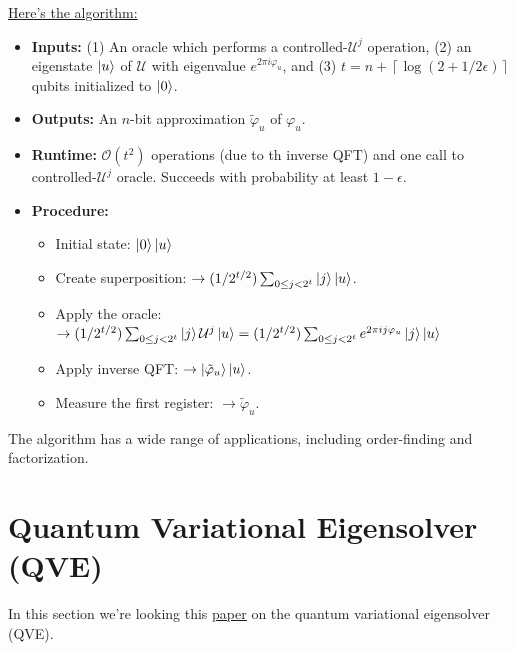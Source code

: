 \documentclass{book}
\theoremstyle{definition}
\newcommand{\lp}{\left(}
\newcommand{\rp}{\right)}
\newcommand{\U}{\mathcal{U}}
\begin{document}
\underline{Here's the algorithm:}
\begin{itemize}
	\item \textbf{Inputs:} (1) An oracle which performs a controlled-$\U^j$ operation, (2) an eigenstate $\ket{u}$ of $\U$ with eigenvalue $e^{2\pi i \varphi_u}$, and (3) $t = n + \left\lceil \log \lp 2 + 1/2\epsilon \rp \right \rceil$ qubits initialized to $\ket{0}$.
	
	
	\item \textbf{Outputs:} An $n$-bit approximation $\tilde\varphi_u$ of $\varphi_u$. 
	
	\item \textbf{Runtime:} $\mathcal{O}(t^2)$ operations (due to th inverse QFT) and one call to controlled-$\U^j$ oracle. Succeeds with probability at least $1-\epsilon$. 
	
	\item \textbf{Procedure:} 
	\begin{itemize}
		\item  Initial state: $\ket{0}\ket{u}$
		
		\item Create superposition: $\to (1/2^{t/2})\sum_{0 \leq j < 2^t}\ket{j}\ket{u}$.
		
		
		\item Apply the oracle:\\ $\to(1/2^{t/2})\sum_{0 \leq j < 2^t}\ket{j}\U^j\ket{u} = (1/2^{t/2})\sum_{0 \leq j < 2^t}e^{2\pi i j\varphi_u}\ket{j}\ket{u}$
		
		
		\item Apply inverse QFT: $\to \ket{\tilde\varphi_u}\ket{u}$. 
		
		\item Measure the first register: $\to \tilde \varphi_u$.
	\end{itemize}
\end{itemize}


The algorithm has a wide range of applications, including order-finding and factorization. 










\newpage


\section{Quantum Variational Eigensolver (QVE)}      

In this section we're looking this \href{https://www.ncbi.nlm.nih.gov/pmc/articles/PMC4124861/pdf/ncomms5213.pdf}{\underline{paper}} on the quantum variational eigensolver (QVE). \\
\end{document}
